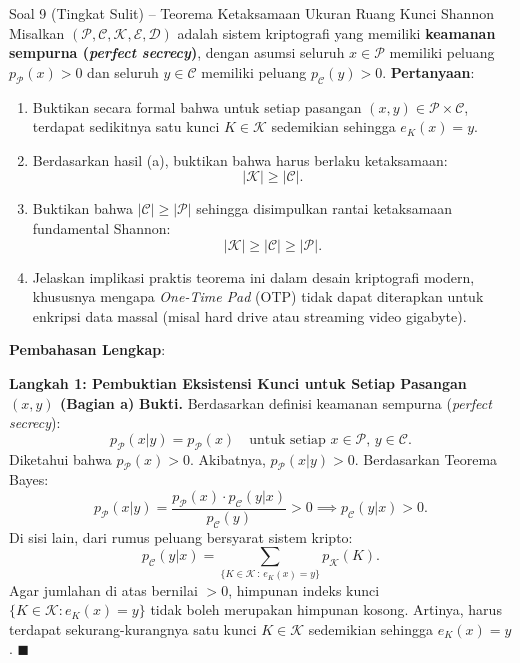 \documentclass[11pt,a4paper]{article}
\newenvironment{proof}{\noindent\textbf{Bukti.}}{\hfill$\blacksquare$\vspace{0.3em}}
\begin{document}
\begin{soalsulit}{Soal 9 (Tingkat Sulit) -- Teorema Ketaksamaan Ukuran Ruang Kunci Shannon}
Misalkan $(\mathcal{P}, \mathcal{C}, \mathcal{K}, \mathcal{E}, \mathcal{D})$ adalah sistem kriptografi yang memiliki \textbf{keamanan sempurna (\textit{perfect secrecy})}, dengan asumsi seluruh $x \in \mathcal{P}$ memiliki peluang $p_{\mathcal{P}}(x) > 0$ dan seluruh $y \in \mathcal{C}$ memiliki peluang $p_{\mathcal{C}}(y) > 0$.
\textbf{Pertanyaan}:
\begin{enumerate}[label=\alph*)]
    \item Buktikan secara formal bahwa untuk setiap pasangan $(x, y) \in \mathcal{P} \times \mathcal{C}$, terdapat sedikitnya satu kunci $K \in \mathcal{K}$ sedemikian sehingga $e_K(x) = y$.
    \item Berdasarkan hasil (a), buktikan bahwa harus berlaku ketaksamaan:
    \[
    |\mathcal{K}| \ge |\mathcal{C}|.
    \]
    \item Buktikan bahwa $|\mathcal{C}| \ge |\mathcal{P}|$ sehingga disimpulkan rantai ketaksamaan fundamental Shannon:
    \[
    |\mathcal{K}| \ge |\mathcal{C}| \ge |\mathcal{P}|.
    \]
    \item Jelaskan implikasi praktis teorema ini dalam desain kriptografi modern, khususnya mengapa \textit{One-Time Pad} (OTP) tidak dapat diterapkan untuk enkripsi data massal (misal hard drive atau streaming video gigabyte).
\end{enumerate}
\end{soalsulit}

\noindent\textbf{Pembahasan Lengkap}:

\noindent\textbf{Langkah 1: Pembuktian Eksistensi Kunci untuk Setiap Pasangan $(x, y)$ (Bagian a)}
\begin{proof}
Berdasarkan definisi keamanan sempurna (\textit{perfect secrecy}):
\begin{equation}
p_{\mathcal{P}}(x|y) = p_{\mathcal{P}}(x) \quad \text{untuk setiap } x \in \mathcal{P}, \, y \in \mathcal{C}.
\end{equation}
Diketahui bahwa $p_{\mathcal{P}}(x) > 0$. Akibatnya, $p_{\mathcal{P}}(x|y) > 0$.
Berdasarkan Teorema Bayes:
\begin{equation}
p_{\mathcal{P}}(x|y) = \frac{p_{\mathcal{P}}(x) \cdot p_{\mathcal{C}}(y|x)}{p_{\mathcal{C}}(y)} > 0 \implies p_{\mathcal{C}}(y|x) > 0.
\end{equation}
Di sisi lain, dari rumus peluang bersyarat sistem kripto:
\begin{equation}
p_{\mathcal{C}}(y|x) = \sum_{\{K \in \mathcal{K} \,:\, e_K(x) = y\}} p_{\mathcal{K}}(K).
\end{equation}
Agar jumlahan di atas bernilai $> 0$, himpunan indeks kunci $\{K \in \mathcal{K} : e_K(x) = y\}$ tidak boleh merupakan himpunan kosong.
Artinya, harus terdapat sekurang-kurangnya satu kunci $K \in \mathcal{K}$ sedemikian sehingga $e_K(x) = y$.
\end{proof}
\end{document}
